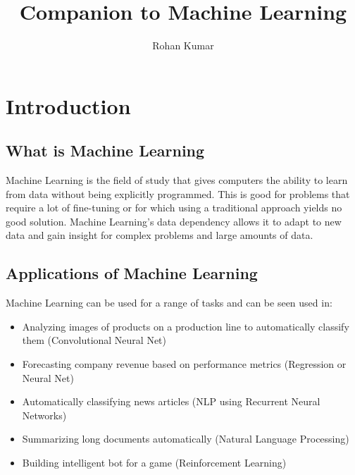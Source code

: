 \documentclass[12pt]{article}
\title{Companion to Machine Learning}
\author{Rohan Kumar}
\date{}
\begin{document}
\maketitle
\newpage
\tableofcontents
\newpage

\section*{Introduction}

\subsection{What is Machine Learning}
    Machine Learning is the field of study that gives computers the ability to learn from data without being 
    explicitly programmed. This is good for problems that require a lot of fine-tuning or for which using a 
    traditional approach yields no good solution. Machine Learning's data dependency allows it to adapt to new data
    and gain insight for complex problems and large amounts of data.

\subsection{Applications of Machine Learning}
    Machine Learning can be used for a range of tasks and can be seen used in:
    \begin{itemize}
        \item Analyzing images of products on a production line to automatically classify them (Convolutional Neural Net)
        \item Forecasting company revenue based on performance metrics (Regression or Neural Net)
        \item Automatically classifying news articles (NLP using Recurrent Neural Networks)
        \item Summarizing long documents automatically (Natural Language Processing)
        \item Building intelligent bot for a game (Reinforcement Learning)
    \end{itemize}
\end{document}
